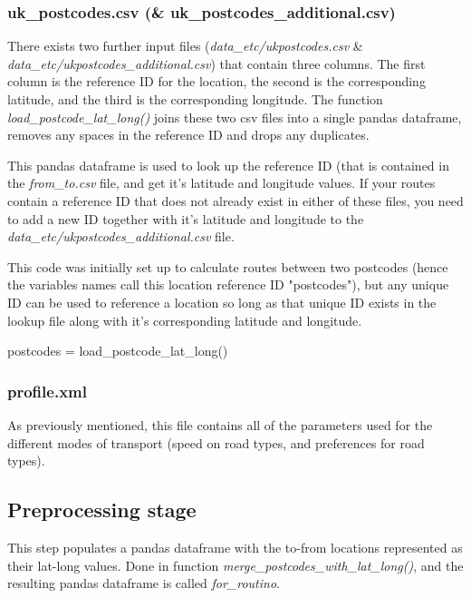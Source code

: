 \documentclass{article}
\begin{document}
\begin{flushleft}
\subsubsection{uk\_postcodes.csv (\& uk\_postcodes\_additional.csv)} 
There exists two further input files (\textit{data\_etc/ukpostcodes.csv} \& \\
\textit{data\_etc/ukpostcodes\_additional.csv}) that contain three columns. The first column is the reference ID for the location, the second is the corresponding latitude, and the third is the corresponding longitude. The function \textit{load\_postcode\_lat\_long()} joins these two csv files into a single pandas dataframe, removes any spaces in the reference ID and drops any duplicates.\\

\vspace{\baselineskip}

This pandas dataframe is used to look up the reference ID (that is contained in the \textit{from\_to.csv} file, and get it's latitude and longitude values. If your routes contain a reference ID that does not already exist in either of these files, you need to add a new ID together with it's latitude and longitude to the \textit{data\_etc/ukpostcodes\_additional.csv} file.\\

\vspace{\baselineskip}

This code was initially set up to calculate routes between two postcodes (hence the variables names call this location reference ID "postcodes"), but any unique ID can be used to reference a location so long as that unique ID exists in the lookup file along with it's corresponding latitude and longitude.\\

\begin{python}
	postcodes = load_postcode_lat_long()
\end{python}

\subsubsection{profile.xml} 
As previously mentioned, this file contains all of the parameters used for the different modes of transport (speed on road types, and preferences for road types).

\subsection{Preprocessing stage}
This step populates a pandas dataframe with the to-from locations represented as their lat-long values.
Done in function \textit{merge\_postcodes\_with\_lat\_long()}, and the resulting pandas dataframe is called \textit{for\_routino}.


\end{flushleft}
\end{document}
